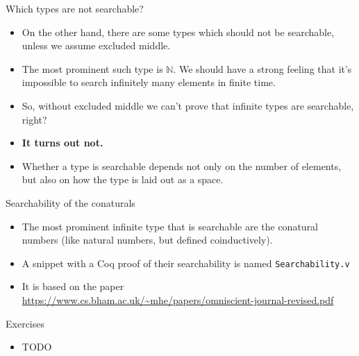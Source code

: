 \documentclass{beamer}
\begin{document}
\begin{frame}{Which types are not searchable?}
\begin{itemize}
	\item On the other hand, there are some types which should not be searchable, unless we assume excluded middle.
	\item The most prominent such type is $\mathbb{N}$. We should have a strong feeling that it's impossible to search infinitely many elements in finite time.
	\item So, without excluded middle we can't prove that infinite types are searchable, right?
	\item \textbf{It turns out not.}
	\item Whether a type is searchable depends not only on the number of elements, but also on how the type is laid out as a space.
\end{itemize}
\end{frame}

\begin{frame}{Searchability of the conaturals}
\begin{itemize}
	\item The most prominent infinite type that is searchable are the conatural numbers (like natural numbers, but defined coinductively).
	\item A snippet with a Coq proof of their searchability is named \texttt{Searchability.v}
	\item It is based on the paper \url{https://www.cs.bham.ac.uk/~mhe/papers/omniscient-journal-revised.pdf}
\end{itemize}
\end{frame}

\begin{frame}{Exercises}
\begin{itemize}
	\item TODO
\end{itemize}
\end{frame}
\end{document}
